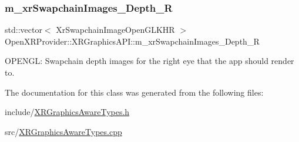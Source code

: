 \subsubsection{\texorpdfstring{m\_xrSwapchainImages\_Depth\_R}{m\_xrSwapchainImages\_Depth\_R}}
{\footnotesize\ttfamily std\+::vector$<$ Xr\+Swapchain\+Image\+Open\+G\+L\+K\+HR $>$ Open\+X\+R\+Provider\+::\+X\+R\+Graphics\+A\+P\+I\+::m\+\_\+xr\+Swapchain\+Images\+\_\+\+Depth\+\_\+R\hspace{0.3cm}{\ttfamily [private]}}



O\+P\+E\+N\+GL\+: Swapchain depth images for the right eye that the app should render to. 



The documentation for this class was generated from the following files\+:\begin{DoxyCompactItemize}
\item 
include/\mbox{\hyperlink{_x_r_graphics_aware_types_8h}{X\+R\+Graphics\+Aware\+Types.\+h}}\item 
src/\mbox{\hyperlink{_x_r_graphics_aware_types_8cpp}{X\+R\+Graphics\+Aware\+Types.\+cpp}}\end{DoxyCompactItemize}
